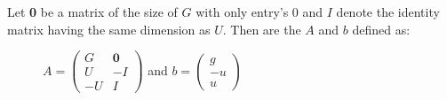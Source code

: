 \begin{frame}
	\begin{definition}[\iterationmatrix, \iterationconstants]
		Let \textbf{0} be a matrix of the size of $G$ with only entry's 0 and $I$ denote the identity matrix having the same dimension as $U$. Then are the \iterationmatrix $A$ and \iterationconstants $b$ defined as:
		\begin{figure}[H]
			\centering
			$A = \begin{pmatrix} G & \textbf{0} \\ U & -I \\ -U & I \end{pmatrix}$ and $b = \begin{pmatrix} g \\ -u \\ u \end{pmatrix}$
		\end{figure}
	
	\end{definition}
\end{frame}

